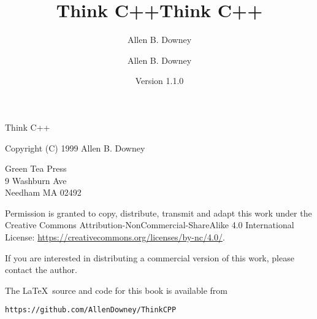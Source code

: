 \documentclass{book}
\title{Think C++}
\author{Allen B. Downey}
\date{}
\begin{document}
\title {Think C++}
\author {Allen B. Downey}
\date {Version 1.1.0}
\maketitle

\vspace{2in}
\begin{center}
{\Large Think C++}

\vspace{0.25in}

Copyright (C) 1999  Allen B. Downey
\end{center}
\vspace{0.25in}

\begin{flushleft}
Green Tea Press       \\
9 Washburn Ave \\
Needham MA 02492
\end{flushleft}

Permission is granted to copy, distribute, transmit and adapt this
work under the Creative Commons Attribution-NonCommercial-ShareAlike 4.0
International License: \url{https://creativecommons.org/licenses/by-nc/4.0/}.

If you are interested in distributing a commercial version of this
work, please contact the author.

The \LaTeX\ source and code for this book is available from

\begin{verbatim}
https://github.com/AllenDowney/ThinkCPP
\end{verbatim}



\frontmatter
\tableofcontents

\mainmatter
















\appendix


\printindex
\end{document}
